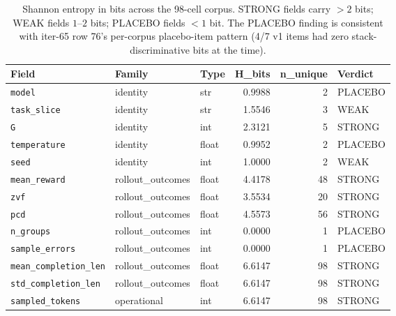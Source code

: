 \begin{table}[htbp]
\centering\scriptsize
\begin{tabular}{lllrrl}
\hline
\textbf{Field} & \textbf{Family} & \textbf{Type} & \textbf{H\_bits} & \textbf{n\_unique} & \textbf{Verdict} \\
\hline
\texttt{model}                    & identity        & str   & 0.9988 & 2  & PLACEBO \\
\texttt{task\_slice}               & identity        & str   & 1.5546 & 3  & WEAK    \\
\texttt{G}                        & identity        & int   & 2.3121 & 5  & STRONG  \\
\texttt{temperature}              & identity        & float & 0.9952 & 2  & PLACEBO \\
\texttt{seed}                     & identity        & int   & 1.0000 & 2  & WEAK    \\
\texttt{mean\_reward}             & rollout\_outcomes & float & 4.4178 & 48 & STRONG  \\
\texttt{zvf}                      & rollout\_outcomes & float & 3.5534 & 20 & STRONG  \\
\texttt{pcd}                      & rollout\_outcomes & float & 4.5573 & 56 & STRONG  \\
\texttt{n\_groups}                & rollout\_outcomes & int   & 0.0000 & 1  & PLACEBO \\
\texttt{sample\_errors}           & rollout\_outcomes & int   & 0.0000 & 1  & PLACEBO \\
\texttt{mean\_completion\_len}    & rollout\_outcomes & float & 6.6147 & 98 & STRONG  \\
\texttt{std\_completion\_len}     & rollout\_outcomes & float & 6.6147 & 98 & STRONG  \\
\texttt{sampled\_tokens}          & operational     & int   & 6.6147 & 98 & STRONG  \\
\hline
\end{tabular}
\caption{Shannon entropy in bits across the 98-cell corpus. STRONG
fields carry $> 2$ bits; WEAK fields $1$--$2$ bits; PLACEBO fields
$< 1$ bit. The PLACEBO finding is consistent with iter-65 row 76's
per-corpus placebo-item pattern (4/7 v1 items had zero stack-discriminative
bits at the time).}
\label{tab:p5-v25-placebo}
\end{table}

